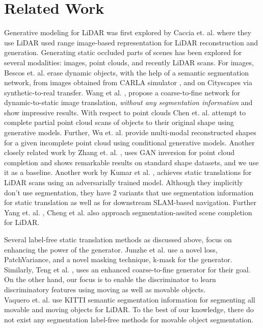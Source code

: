 \documentclass[10pt,twocolumn,letterpaper]{article}
\begin{document}
\section{Related Work}
\label{related}
 Generative modeling for LiDAR was first explored by Caccia et. al. \cite{caccia2018deep} where they use LiDAR used range image-based representation for  LiDAR reconstruction and generation. Generating static occluded parts of scenes has been explored for several modalities: images, point clouds, and recently LiDAR scans. For images, Bescos et. al. \cite{bescos2019empty} erase dynamic objects, with the help of a semantic segmentation network, from images obtained from CARLA simulator \cite{dosovitskiy2017carla}, and on Cityscapes via synthetic-to-real transfer. Wang et al. \cite{wang2022coarse}, propose a coarse-to-fine network for dynamic-to-static image translation, \textit{without any segmentation information} and show impressive results.  With respect to point clouds Chen et. al. \cite{chen2019unpaired} attempt to complete partial point cloud scans of objects \cite{chang2017matterport3d,dai2017scannet} to their original shape using generative models. Further, Wu et. al. \cite{wu2020multimodal} provide multi-modal reconstructed shapes for a given incomplete point cloud using conditional generative models. Another closely related work by Zhang et. al. \cite{zhang2021unsupervised}, uses GAN inversion for point cloud completion and shows remarkable results on standard shape datasets, and we use it as a baseline. Another work by Kumar et al. \cite{kumar2021dslr}, achieves static translations for LiDAR scans using an adversarially trained model. Although they implicitly don't use segmentation, they have 2 variants that use segmentation information for static translation as well as for downstream SLAM-based navigation. Further Yang et. al. \cite{yang2021semantic}, Cheng et al. \cite{cheng2020s3cnet} also approach segmentation-assited scene completion for LiDAR.
 

Several label-free static translation methods as discussed above, focus on enhancing the power of the generator. Junzhe et al. \cite{zhang2021unsupervised} use a novel loss, PatchVariance, and a novel masking technique, k-mask for the generator. Similarly, Teng et al. \cite{wang2022coarse}, uses an enhanced coarse-to-fine generator for their goal. On the other hand, our focus is to enable the discriminator to learn discriminatory features using moving as well as movable objects.  \\
Vaquero et. al. \cite{vaquero2019improving} use KITTI semantic segmentation information for segmenting all movable and moving objects for LiDAR. To the best of our knowledge, there do not exist any segmentation label-free methods for movable object segmentation. \\ 
\end{document}
